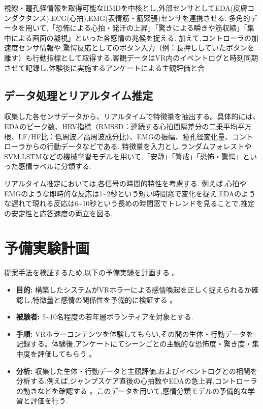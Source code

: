 \documentclass[paper=a4paper,fontsize=10pt,jafontscale=0.925,twocolumn]{jlreq}
\begin{document}
視線・瞳孔径情報を取得可能なHMDを中核とし,外部センサとしてEDA(皮膚コンダクタンス),ECG(心拍),EMG(表情筋・筋緊張)センサを連携させる. 多角的データを用いて,「恐怖による心拍・発汗の上昇」「驚きによる瞬きや筋収縮」「集中による画面の凝視」といった各感情の兆候を捉える. 加えて,コントローラの加速度センサ情報や,驚愕反応としてのボタン入力（例：長押ししていたボタンを離す）も行動指標として取得する.客観データはVR内のイベントログと時刻同期させて記録し,体験後に実施するアンケートによる主観評価と合

\subsection{データ処理とリアルタイム推定}

収集した各センサデータから、リアルタイムで特徴量を抽出する。具体的には、EDAのピーク数、HRV指標（RMSSD：連続する心拍間隔差分の二乗平均平方根、LF/HF比：低周波／高周波成分比）、EMGの振幅、瞳孔径変化量、コントローラからの行動データなどである. 特徴量を入力とし,ランダムフォレストやSVM,LSTMなどの機械学習モデルを用いて,「安静」「警戒」「恐怖・驚愕」といった感情ラベルに分類する.

リアルタイム推定においては,各信号の時間的特性を考慮する. 例えば,心拍やEMGのような即時的な反応は1\textasciitilde2秒という短い時間窓で変化を捉え,EDAのような遅れて現れる反応は6\textasciitilde10秒という長めの時間窓でトレンドを見ることで,推定の安定性と応答速度の両立を図る.

\section{予備実験計画}

提案手法を検証するため,以下の予備実験を計画する 。

\begin{itemize}
    \item \textbf{目的:} 構築したシステムがVRホラーによる感情喚起を正しく捉えられるか確認し,特徴量と感情の関係性を予備的に検証する 。
    \item \textbf{被験者:} 5\textasciitilde10名程度の若年層ボランティアを対象とする.
    \item \textbf{手順:} VRホラーコンテンツを体験してもらい,その間の生体・行動データを記録する。体験後,アンケートにてシーンごとの主観的な恐怖度・驚き度・集中度を評価してもらう 。
    \item \textbf{分析:} 収集した生体・行動データと主観評価,およびイベントログとの相関を分析する.例えば,ジャンプスケア直後の心拍数やEDAの急上昇,コントローラの動きなどを確認する 。このデータを用いて,感情分類モデルの予備的な学習と評価を行う.
\end{itemize}
\end{document}
